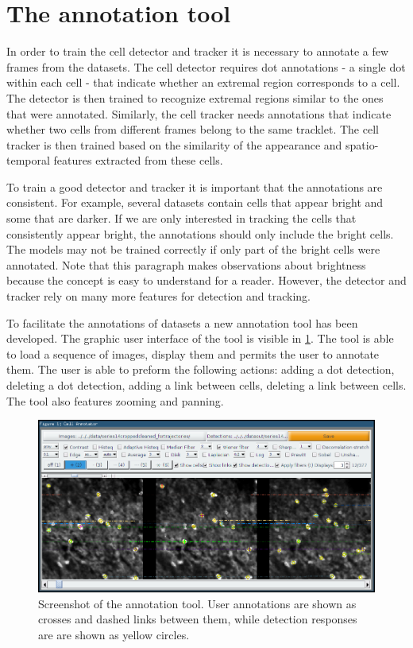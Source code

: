     \section{The annotation tool \statusfirstdraft}
    \label{sec:data_tool}
    	In order to train the cell detector and tracker it is necessary to annotate a few frames from the datasets. The cell detector requires dot annotations - a single dot within each cell - that indicate whether an extremal region corresponds to a cell. The detector is then trained to recognize extremal regions similar to the ones that were annotated. Similarly, the cell tracker needs annotations that indicate whether two cells from different frames belong to the same tracklet. The cell tracker is then trained based on the similarity of the appearance and spatio-temporal features extracted from these cells.
    	
    	To train a good detector and tracker it is important that the annotations are consistent. For example, several datasets contain cells that appear bright and some that are darker. If we are only interested in tracking the cells that consistently appear bright, the annotations should only include the bright cells. The models may not be trained correctly if only part of the bright cells were annotated. Note that this paragraph makes observations about brightness because the concept is easy to understand for a reader. However, the detector and tracker rely on many more features for detection and tracking.
	
		To facilitate the annotations of datasets a new annotation tool has been developed. The graphic user interface of the tool is visible in \cref{fig:data_annotator_screenshot}. The tool is able to load a sequence of images, display them and permits the user to annotate them. The user is able to preform the following actions: adding a dot detection, deleting a dot detection, adding a link between cells, deleting a link between cells. The tool also features zooming and panning.
		

		\begin{figure}
			\includegraphics[width=\textwidth]{images/data_annotator_screenshot}
			\caption{Screenshot of the annotation tool. User annotations are shown as crosses and dashed links between them, while detection responses are are shown as yellow circles.}
			\label{fig:data_annotator_screenshot}
		\end{figure}
		
